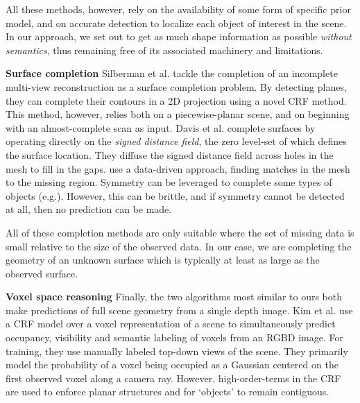 \documentclass[10pt,twocolumn,letterpaper]{article}
\makeatletter
\renewcommand*{\eg}{e.g.\@\xspace}
\newcommand*{\ea}{et al.\@\xspace}
\renewcommand{\paragraph}{\vspace{2pt}\noindent\textbf}
\makeatother
\begin{document}
All these methods, however, rely on the availability of some form of specific prior model, and on accurate detection to localize each object of interest in the scene.
In our approach, we set out to get as much shape information as possible \emph{without semantics}, thus remaining free of its associated machinery and limitations.


\paragraph{Surface completion}\newline
Silberman \ea \cite{silberman-eccv-2014} tackle the completion of an incomplete multi-view reconstruction as a surface completion problem.
By detecting planes, they can complete their contours in a 2D projection using a novel CRF method.
This method, however, relies both on a piecewise-planar scene, and on beginning with an almost-complete scan as input.
Davis \ea \cite{davis-3dpvt-2002} complete surfaces by operating directly on the \emph{signed distance field}, the zero level-set of which defines the surface location. They diffuse the signed distance field across holes in the mesh to fill in the gaps.
\cite{harary-tog-2013} use a data-driven approach, finding matches in the mesh to the missing region.
Symmetry can be leveraged to complete some types of objects (\eg \cite{law-cviu-2010, thrun-iccv-2005, kroemer-humanoids-2012}).
However, this can be brittle, and if symmetry cannot be detected at all, then no prediction can be made.

All of these completion methods are only suitable where the set of missing data is small relative to the size of the observed data.
In our case, we are completing the geometry of an unknown surface which is typically at least as large as the observed surface.






\paragraph{Voxel space reasoning}\newline
Finally, the two algorithms most similar to ours both make predictions of full scene geometry from a single depth image.
Kim \ea \cite{kim-iccv-2013} use a CRF model over a voxel representation of a scene to simultaneously predict occupancy, visibility and semantic labeling of voxels from an RGBD image.
For training, they use manually labeled top-down views of the scene.
They primarily model the probability of a voxel being occupied as a Gaussian centered on the first observed voxel along a camera ray.
However, high-order-terms in the CRF are used to enforce planar structures and for `objects' to remain contiguous.
\end{document}
